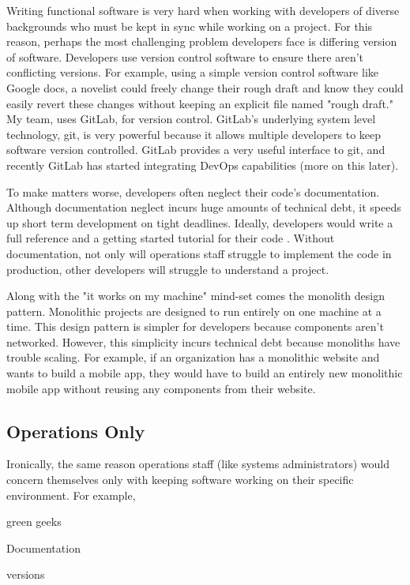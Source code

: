 \documentclass[titlepage]{article}
\begin{document}
Writing functional software is very hard when working with developers of diverse backgrounds who must be kept in sync while working on a project. For this reason, perhaps the most challenging problem developers face is differing version of software. Developers use version control software to ensure there aren’t conflicting versions. For example, using a simple version control software like Google docs, a novelist could freely change their rough draft and know they could easily revert these changes without keeping an explicit file named "rough draft." My team, uses GitLab, for version control. GitLab's underlying system level technology, git, is very powerful because it allows multiple developers to keep software version controlled. GitLab provides a very useful interface to git, and recently GitLab has started integrating DevOps capabilities (more on this later).

To make matters worse, developers often neglect their code's documentation. Although documentation neglect incurs huge amounts of technical debt, it speeds up short term development on tight deadlines. Ideally, developers would write a full reference and a getting started tutorial for their code \cite{Dagenais:2010:CED:1882291.1882312}. Without documentation, not only will operations staff struggle to implement the code in production, other developers will struggle to understand a project. 

Along with the "it works on my machine" mind-set comes the monolith design pattern. Monolithic projects are designed to run entirely on one machine at a time. This design pattern is simpler for developers because components aren't networked. However, this simplicity incurs technical debt because monoliths have trouble scaling. For example, if an organization has a monolithic website and wants to build a mobile app, they would have to build an entirely new monolithic mobile app without reusing any components from their website.

\subsection{Operations Only}

Ironically, the same reason operations staff (like systems administrators) would concern themselves only with keeping software working on their specific environment. For example, 

green geeks

Documentation

versions
\end{document}
